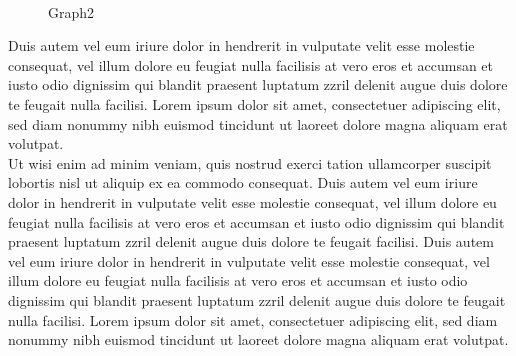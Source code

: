 \documentclass[10pt]{scrartcl}
\begin{document}
\noindent \begin{wrapfigure}{r!}{0.37\textwidth}
     \vspace{-12pt}
     { \centering %
     \\ }
     \vspace{-5pt}
     \caption{Graph2}
     \vspace{-20pt}
\end{wrapfigure}
Duis autem vel eum iriure dolor in hendrerit in vulputate velit esse molestie consequat, vel illum dolore eu feugiat nulla facilisis at vero eros et accumsan et iusto odio dignissim qui blandit praesent luptatum zzril delenit augue duis dolore te feugait nulla facilisi. Lorem ipsum dolor sit amet, consectetuer adipiscing elit, sed diam nonummy nibh euismod tincidunt ut laoreet dolore magna aliquam erat volutpat.\\[8pt]
Ut wisi enim ad minim veniam, quis nostrud exerci tation ullamcorper suscipit lobortis nisl ut aliquip ex ea commodo consequat. Duis autem vel eum iriure dolor in hendrerit in vulputate velit esse molestie consequat, vel illum dolore eu feugiat nulla facilisis at vero eros et accumsan et iusto odio dignissim qui blandit praesent luptatum zzril delenit augue duis dolore te feugait facilisi. Duis autem vel eum iriure dolor in hendrerit in vulputate velit esse molestie consequat, vel illum dolore eu feugiat nulla facilisis at vero eros et accumsan et iusto odio dignissim qui blandit praesent luptatum zzril delenit augue duis dolore te feugait nulla facilisi. Lorem ipsum dolor sit amet, consectetuer adipiscing elit, sed diam nonummy nibh euismod tincidunt ut laoreet dolore magna aliquam erat volutpat.

\newpage
\end{document}
